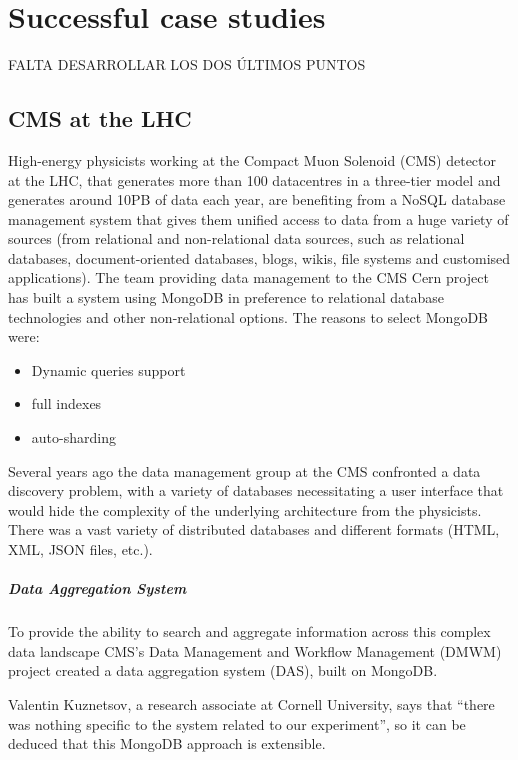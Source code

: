 \chapter{Successful case studies}


FALTA DESARROLLAR LOS DOS ÚLTIMOS PUNTOS



\section{CMS at the LHC}

High-energy physicists working at the Compact Muon Solenoid (CMS) detector at the LHC, that generates more than 100 datacentres in a three-tier model and generates around 10PB of data each year, are benefiting from a NoSQL database management system that gives them unified access to data from a huge variety of sources (from relational and non-relational data sources, such as relational databases, document-oriented databases, blogs, wikis, file systems and customised applications). The team providing data management to the CMS Cern project has built a system using MongoDB in preference to relational database technologies and other non-relational options. The reasons to select MongoDB were:

\begin{itemize}
\item Dynamic queries support
\item full indexes
\item auto-sharding
\end{itemize}

Several years ago the data management group at the CMS confronted a data discovery problem, with a variety of databases necessitating a user interface that would hide the complexity of the underlying architecture from the physicists. There was a vast variety of distributed databases and different formats (HTML, XML, JSON files, etc.).

%
\paragraph{Data Aggregation System}
To provide the ability to search and aggregate information across this complex data landscape CMS's Data Management and Workflow Management (DMWM) project created a data aggregation system (DAS), built on MongoDB. 

Valentin Kuznetsov, a research associate at Cornell University, says that ``there was nothing specific to the system related to our experiment'', so it can be deduced that this MongoDB approach is extensible. 

